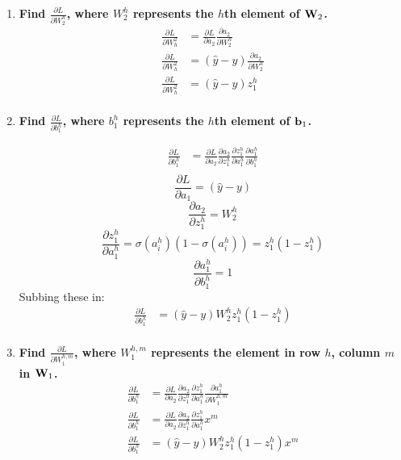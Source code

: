 \documentclass[submit]{harvardml}
\begin{document}
\begin{enumerate}
\begin{enumerate}
        \item \textbf{Find $\frac{\partial L}{\partial W_2^h}$, where $W_2^h$ represents the $h$th element of $\bold{W}_2$.}
        \begin{align*}
            \frac{\partial L}{\partial W_h^2} &= \frac{\partial L}{\partial a_2}\frac{\partial a_2}{\partial W_2^h}\\
            \frac{\partial L}{\partial W_h^2} &= (\hat{y} - y)\frac{\partial a_2}{\partial W_2^h}\\
            \frac{\partial L}{\partial W_h^2} &= (\hat{y} - y)z_1^h\\
        \end{align*}
        
        \item \textbf{Find $\frac{\partial L}{\partial b_1^h}$, where $b_1^h$ represents the $h$th element of $\bold{b}_1$. }
        
        \begin{align*}
            \frac{\partial L}{\partial b_1^h} &= \frac{\partial L}{\partial a_2}\frac{\partial a_2}{\partial z_1^h}\frac{\partial z_1^h}{\partial a_1^h}\frac{\partial a_1^h}{\partial b_1^h}\\
        \end{align*}
        $$
            \frac{\partial L}{\partial a_1} = (\hat{y} - y)
        $$
        $$
            \frac{\partial a_2}{\partial z_1^h} = W_2^h
        $$
        $$
            \frac{\partial z_1^h}{\partial a_1^h} = \sigma (a_i^h)(1 - \sigma (a_i^h)) = z_1^h(1 - z_1^h)
        $$
        $$
            \frac{\partial a_1^h}{\partial b_1^h} = 1
        $$
        Subbing these in:
        \begin{align*}
            \frac{\partial L}{\partial b_1^h} &= (\hat{y} - y) W_2^h z_1^h(1 - z_1^h)\\
        \end{align*}
        
        
        \item \textbf{Find $\frac{\partial L}{\partial W_1^{h,m}}$, where  $W_1^{h,m}$ represents the element in row $h$, column $m$ in $\bold{W}_1$.}
        \begin{align*}
            \frac{\partial L}{\partial b_1^h} &= \frac{\partial L}{\partial a_2}\frac{\partial a_2}{\partial z_1^h}\frac{\partial z_1^h}{\partial a_1^h}\frac{\partial a_1^h}{\partial W_1^{h,m}}\\
            \frac{\partial L}{\partial b_1^h} &= \frac{\partial L}{\partial a_2}\frac{\partial a_2}{\partial z_1^h}\frac{\partial z_1^h}{\partial a_1^h}x^m\\
            \frac{\partial L}{\partial b_1^h} &= (\hat{y} - y) W_2^h z_1^h(1 - z_1^h) x^m\\
        \end{align*}
    \end{enumerate}
\end{enumerate}
\end{document}
